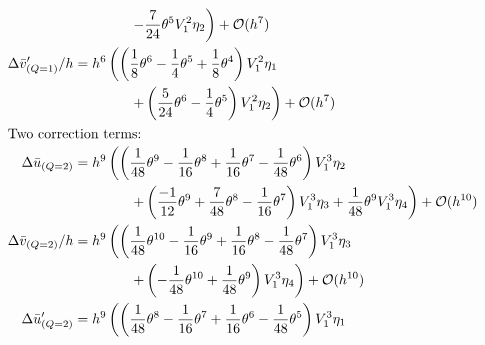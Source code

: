 \begin{align*}
                              & \qquad\qquad \left. -\frac{7}{24} \theta^{5} V_{1}^{2} \eta_{2}\right) + \mathcal{O}(h^{7})                                                                                                                                              \\
    \Delta \bar{v}'_{(Q=1)}/h & = h^{6}\left(\left(\frac{1}{8} \theta^{6} - \frac{1}{4} \theta^{5} + \frac{1}{8} \theta^{4}\right) V_{1}^{2} \eta_{1}\right.                                                                                                             \\
                              & \qquad\qquad  \left.+ \left(\frac{5}{24} \theta^{6} - \frac{1}{4} \theta^{5}\right) V_{1}^{2} \eta_{2}\right) + \mathcal{O}(h^{7})                                                                                                       \\
    \intertext{Two correction terms:}
    \Delta \bar{u}_{(Q=2)}    & = h^{9}\left(\left(\frac{1}{48} \theta^{9} - \frac{1}{16} \theta^{8} + \frac{1}{16} \theta^{7} - \frac{1}{48} \theta^{6}\right) V_{1}^{3} \eta_{2} \right.                                                                               \\
                              & \qquad\qquad \left.
    + \left(\frac{-1}{12} \theta^{9} + \frac{7}{48} \theta^{8} - \frac{1}{16} \theta^{7}\right) V_{1}^{3} \eta_{3} 											%
    +\frac{1}{48} \theta^{9} V_{1}^{3} \eta_{4}\right) + \mathcal{O}(h^{10})                                                                                                                                                                                             \\
    \Delta \bar{v}_{(Q=2)}/h  & = h^{9}\left(\left(\frac{1}{48} \theta^{10} - \frac{1}{16} \theta^{9} + \frac{1}{16} \theta^{8} - \frac{1}{48} \theta^{7}\right) V_{1}^{3} \eta_{3} \right.                                                                              \\
                              & \qquad\qquad \left. + \left(-\frac{1}{48} \theta^{10} + \frac{1}{48} \theta^{9}\right) V_{1}^{3} \eta_{4}\right) + \mathcal{O}(h^{10})                                                                                                   \\
    \Delta \bar{u}'_{(Q=2)}   & = h^{9}\left(\left(\frac{1}{48} \theta^{8} - \frac{1}{16} \theta^{7} + \frac{1}{16} \theta^{6} - \frac{1}{48} \theta^{5}\right) V_{1}^{3} \eta_{1} \right.                                                                               \\

\end{align*}
